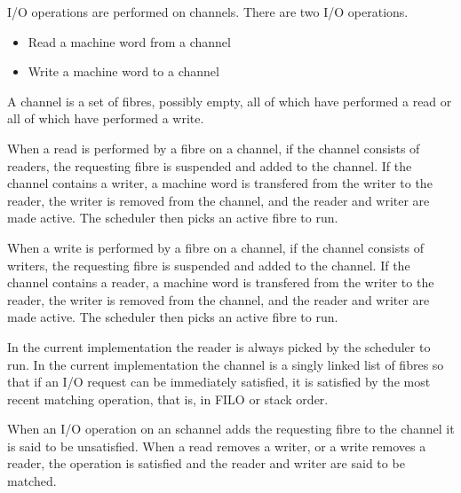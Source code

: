 \documentclass[oneside]{book}
\begin{document}
I/O operations are performed on channels. There are two I/O operations.
\begin{itemize}
\item Read a machine word from a channel
\item Write a machine word to a channel
\end{itemize}

A channel is a set of fibres, possibly empty, all of which have performed
a read or all of which have performed a write. 

When a read is performed
by a fibre on a channel, if the channel consists of readers, the requesting
fibre is suspended and added to the channel. If the channel contains a writer,
a machine word is transfered from the writer to the reader, the writer
is removed from the channel, and the reader and writer are made active.
The scheduler then picks an active fibre to run.

When a write is performed
by a fibre on a channel, if the channel consists of writers, the requesting
fibre is suspended and added to the channel. If the channel contains a reader,
a machine word is transfered from the writer to the reader, the writer
is removed from the channel, and the reader and writer are made active.
The scheduler then picks an active fibre to run.

In the current implementation the reader is always picked by the scheduler
to run. In the current implementation the channel is a singly linked list
of fibres so that if an I/O request can be immediately satisfied, it is
satisfied by the most recent matching operation, that is, in FILO or
stack order.

When an I/O operation on an schannel adds the requesting fibre to the
channel it is said to be unsatisfied. When a read removes a writer,
or a write removes a reader, the operation is satisfied and the reader
and writer are said to be matched.
\end{document}
